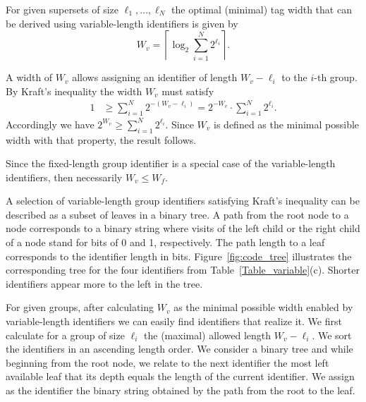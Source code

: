 \begin{property}
For given supersets of size $\ell_1, \ldots, \ell_N$ the optimal (minimal) tag width that can be derived using variable-length identifiers is given by 
\begin{equation} \label{eq2}
W_{v}  = \left \lceil \log_2 \sum_{i = 1}^{N}{2^{\ell_i}} \right \rceil. \nonumber 
\end{equation}
\label{property_variable_length_minimal_tag}
\end{property} 
\bp A width of $W_{v}$ allows assigning an identifier of length $W_{v}
- \ell_i$ to the $i$-th group. By Kraft's inequality the width $W_{v}$
must satisfy
\begin{equation} \label{eq1}
\begin{split}
1 &\ge \sum_{i = 1}^{N}{2^{-(W_{v}-\ell_i)}} = 2^{-W_{v}} \cdot \sum_{i = 1}^{N}{2^{\ell_i}}. \nonumber 
\end{split}
\end{equation}
Accordingly we have $2^{W_{v}}  \ge \sum_{i = 1}^{N}{2^{\ell_i}}$. Since $W_{v}$ is defined as the minimal possible width with that property, the result follows.
\ep

 
Since the fixed-length group identifier is a special case of the
variable-length identifiers, then necessarily $W_{v} \le W_{f}$.

A selection of variable-length group identifiers satisfying Kraft's inequality can be described as a subset of leaves in a binary tree. 
A path from the root node to a node corresponds to a binary string where visits of the left child or the right child of a node stand for bits of 0 and 1, respectively. 
The path length  to a leaf corresponds to the identifier length in bits.
Figure~\ref{fig:code_tree} illustrates the corresponding tree for the four identifiers from Table~\ref{Table_variable}(c).
Shorter identifiers appear more to the left in the tree.

For given groups, after calculating $W_{v}$ as the minimal possible width enabled by variable-length identifiers we can easily find identifiers that realize it. We first calculate for a group of size $\ell_i$ the (maximal) allowed length $W_{v} - \ell_i$. We sort the identifiers in an ascending length order. We consider a binary tree and while beginning from the root node, we relate to the next identifier the most left available leaf that its depth equals the length of the current identifier. We assign as the identifier the binary string obtained by the path from the root to the leaf.
 
